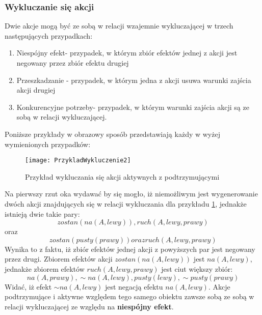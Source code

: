     \subsubsection{Wykluczanie się akcji}
    Dwie akcje mogą być ze sobą w relacji wzajemnie wykluczającej w trzech następujących przypadkach:
    \begin{enumerate}
        \item Niespójny efekt- przypadek, w którym zbiór efektów jednej z akcji 
        jest negowany przez zbiór efektu drugiej
        \item Przeszkadzanie - przypadek, w którym jedna z akcji usuwa warunki 
        zajścia akcji drugiej 
        \item Konkurencyjne potrzeby- przypadek, w którym warunki zajścia akcji 
        są ze sobą w relacji wykluczającej.
    \end{enumerate}
    Poniższe przykłady w obrazowy sposób przedstawiają każdy w wyżej wymienionych
    przypadków:

    \begin{figure}[H]
        \texttt{[image: PrzykladWykluczenie2]}
        \centering
        \caption{Przykład wykluczania się akcji aktywnych z podtrzymującymi}
        \label{PrzykladWykluczenie2}
    \end{figure}

    Na pierwszy rzut oka wydawać by się mogło, iż niemożliwym jest wygenerowanie dwóch akcji znajdujących się w relacji wykluczania dla przykładu 
    \ref{PrzykladWykluczenie2}, jednakże istnieją dwie takie pary: 
    \begin{equation}
        zostan(na(A,lewy)),ruch(A,lewy,prawy)
    \end{equation} 
    oraz 
    \begin{equation}
        zostan(pusty(prawy)) oraz ruch(A,lewy,prawy)
    \end{equation} 
    Wynika to z faktu, iż zbiór efektów jednej akcji z powyższych par jest negowany przez drugi. Zbiorem efektów akcji 
    $zostan(na(A,lewy))$ jest $na(A,lewy)$, jednakże zbiorem efektów $ruch(A,lewy,prawy)$ jest ciut większy zbiór:
    \begin{equation}
        na(A,prawy), \sim na(A,lewy), pusty(lewy), \sim pusty(prawy)
    \end{equation}
    Widać, iż efekt $\sim na(A,lewy)$ jest negacją efektu $na(A,lewy)$. Akcje podtrzymujące i aktywne względem tego samego obiektu zawsze sobą ze sobą 
    w relacji wykluczającej ze względu na \textbf{niespójny efekt}.

